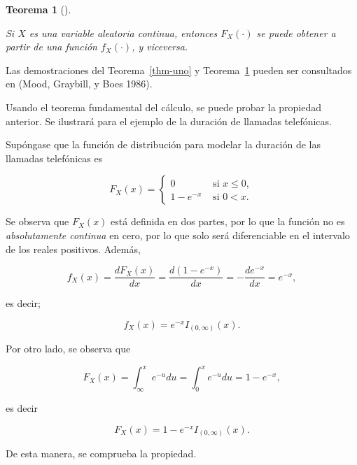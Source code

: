 \documentclass[
  us-letterpaper,
]{scrreprt}
\theoremstyle{plain}
\theoremstyle{definition}
\theoremstyle{definition}
\theoremstyle{plain}
\newtheorem{theorem}{Teorema}[chapter]
\theoremstyle{remark}
\begin{document}
\begin{theorem}[]\protect\hypertarget{thm-dos}{}\label{thm-dos}

Si \(X\) es una variable aleatoria continua, entonces \(F_X(\cdot)\) se
puede obtener a partir de una función \(f_X(\cdot)\), y viceversa.

\end{theorem}

Las demostraciones del Teorema~\ref{thm-uno} y Teorema~\ref{thm-dos}
pueden ser consultados en (Mood, Graybill, y Boes 1986).

\begin{tcolorbox}[enhanced jigsaw, bottomtitle=1mm, coltitle=black, breakable, leftrule=.75mm, left=2mm, rightrule=.15mm, titlerule=0mm, toprule=.15mm, toptitle=1mm, colback=white, colframe=quarto-callout-caution-color-frame, title={Ejemplo (\textbf{\emph{Duración de una llamada telefónica}})}, colbacktitle=quarto-callout-caution-color!10!white, arc=.35mm, bottomrule=.15mm, opacitybacktitle=0.6, opacityback=0]

Usando el teorema fundamental del cálculo, se puede probar la propiedad
anterior. Se ilustrará para el ejemplo de la duración de llamadas
telefónicas.

Supóngase que la función de distribución para modelar la duración de las
llamadas telefónicas es

\[ F_X(x)=\begin{cases}0 & \text{ si } x \le 0,\\ 1-e^{-x} & \text{ si } 0< x.\end{cases} \]

Se observa que \(F_X(x)\) está definida en dos partes, por lo que la
función no es \emph{absolutamente continua} en cero, por lo que solo
será diferenciable en el intervalo de los reales positivos. Además,

\[ f_X(x)=\frac{dF_X(x)}{dx}=\frac{d (1-e^{-x})}{dx}=-\frac{d e^{-x}}{dx}=e^{-x}, \]

es decir;

\[ f_X(x)=e^{-x}I_{(0,\infty)}(x). \]

Por otro lado, se observa que

\[ F_X(x)= \int_{\infty}^x e^{-u}du=\int_0^x e^{-u}du=1-e^{-x}, \]

es decir

\[ F_X(x)=1-e^{-x} I_{(0,\infty)}(x) .\]

De esta manera, se comprueba la propiedad.

\end{tcolorbox}
\end{document}
